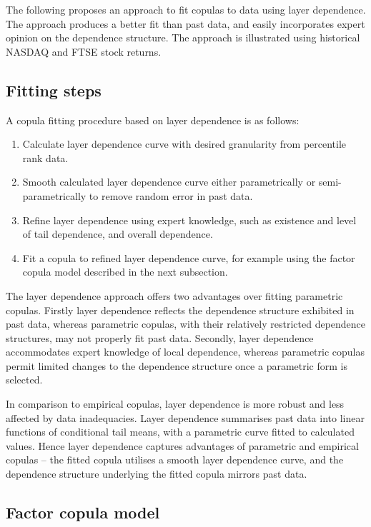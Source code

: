 \documentclass[authoryear]{elsarticle}
\begin{document}
The following proposes an approach to fit copulas to data using layer dependence. The approach produces a better fit than past data, and easily incorporates expert opinion on the dependence structure. The approach is illustrated using historical NASDAQ and FTSE stock returns.

\subsection{Fitting steps}

A copula fitting procedure based on layer dependence is as follows:

\begin{enumerate}
\item Calculate layer dependence curve with desired granularity from percentile rank data.

\item Smooth calculated layer dependence curve either parametrically or semi-parametrically to remove random error in past data.

\item Refine layer dependence using expert knowledge, such as existence and level of tail dependence, and overall dependence.

\item Fit a copula to refined layer dependence curve, for example using the factor copula model described in the next subsection.
\end{enumerate}
The layer dependence approach offers two advantages over fitting parametric copulas. Firstly layer dependence reflects the dependence structure exhibited in past data, whereas parametric copulas, with their relatively restricted dependence structures, may not properly fit past data. Secondly, layer dependence accommodates expert knowledge of local dependence, whereas parametric copulas permit limited changes to the dependence structure once a parametric form is selected.


In comparison to empirical copulas, layer dependence is more robust and less affected by data inadequacies. Layer dependence summarises past data into linear functions of conditional tail means, with a parametric curve fitted to calculated values. Hence layer dependence captures advantages of parametric and empirical copulas -- the fitted copula utilises a smooth layer dependence curve, and the dependence structure underlying the fitted copula mirrors past data.



\subsection{Factor copula model}
\end{document}
